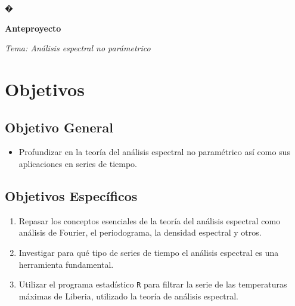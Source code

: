 \documentclass[a4paper,10pt]{article}
\begin{document}
�
\renewcommand{\figurename}{Figura}
\renewcommand{\tablename}{Tabla}
\renewcommand{\labelenumi}{\Roman{enumi}.}
\renewcommand{\labelenumii}{\arabic{enumii}$)$}
\renewcommand{\labelenumiii}{\alph{enumiii}$)$}
\thispagestyle{fancy}
    

\begin{center}
\textbf{Anteproyecto}
\end{center}

\begin{center}
{\em Tema: An\'alisis espectral no par\'ametrico}
\end{center}


\section{Objetivos}
	
	\subsection{Objetivo General}
	\begin{itemize}
		\item Profundizar en la teor\'ia del an\'alisis espectral no param\'etrico as\'i como sus aplicaciones en series de tiempo.
	\end{itemize}
	\subsection{Objetivos Espec\'ificos}
\begin{enumerate}
	\item Repasar los conceptos esenciales de la teor\'ia del an\'alisis espectral como an\'alisis de Fourier,  el periodograma, la densidad espectral y otros.
	 
	\item Investigar para qu\'e tipo de series de tiempo el an\'alisis espectral es una herramienta fundamental.
	
	\item Utilizar el programa estad\'istico \texttt{R} para filtrar la serie de las temperaturas m\'aximas de Liberia, utilizado la teor\'ia de an\'alisis espectral. 

\end{enumerate}
\end{document}
